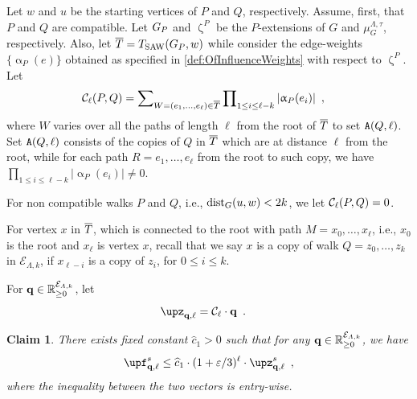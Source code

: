 \documentclass[11pt,reqno]{amsart}
\numberwithin{equation}{section}
\newtheorem{claim}[theorem]{Claim}
\newcommand{\cE}{{\mathcal{E}}}
\newcommand{\applegreen}[1]{ {\color{applegreen}#1}}
\newcommand{\amethyst}[1]{{\color{amethyst}#1} }
\newcommand{\blue}[1]{{\color{blue}#1}}
\newcommand{\bluepigment}[1]{{\color{blue(pigment)}#1}}
\newcommand{\bostonuniversityred}[1]{{\color{bostonuniversityred}#1}}
\newcommand{\capri}[1]{{\color{capri}#1}}
\newcommand{\cadmiumgreen}[1]{{\color{cadmiumgreen}#1}}
\newcommand{\darkmagenta}[1]{{\color{darkmagenta}#1}}
\newcommand{\goldenbrown}[1]{{\color{goldenbrown}#1}}
\newcommand{\heliotrope}[1]{{\color{heliotrope}#1}}
\newcommand{\iris}[1]{{\color{iris}#1}}
\newcommand{\red}[1]{{\color{red}#1}}
\newcommand{\dist}{{\rm dist}}
\newcommand{\ExtV}{\iris{\cE}}
\newcommand{\pfs}{\darkmagenta{s}}
\newcommand{\Tsaw}{T_{\rm SAW}}
\newcommand{\cp}{{\tt A}}
\newcommand{\abs}[1]{\blue{|}#1\blue{|}}
\renewcommand{\applegreen}[1]{#1}
\renewcommand{\amethyst}[1]{#1}
\renewcommand{\blue}[1]{#1}
\renewcommand{\bluepigment}[1]{#1}
\renewcommand{\bostonuniversityred}[1]{#1}
\renewcommand{\capri}[1]{#1}
\renewcommand{\cadmiumgreen}[1]{#1}
\renewcommand{\darkmagenta}[1]{#1}
\renewcommand{\goldenbrown}[1]{#1}
\renewcommand{\heliotrope}[1]{#1}
\renewcommand{\iris}[1]{#1}
\renewcommand{\red}[1]{#1}
\newcommand{\ke}{\blue{e}}
\newcommand{\ki}{\capri{i}}
\newcommand{\kk}{\bluepigment{k}}
\newcommand{\kell}{{\color{green(pigment)}\ell}}%
\newcommand{\kP}{\goldenbrown{P}}
\newcommand{\kQ}{\amethyst{Q}}
\newcommand{\kR}{\bostonuniversityred{R}}%
\newcommand{\ku}{\red{u}}
\newcommand{\kW}{\blue{W}}
\newcommand{\kw}{\blue{w}}
\newcommand{\kx}{\heliotrope{x}}
\newcommand{\kz}{\cadmiumgreen{z}}
\renewcommand{\ke}{e}
\renewcommand{\ki}{i}
\renewcommand{\kk}{k}
\renewcommand{\kell}{\ell}
\renewcommand{\kP}{P}
\renewcommand{\kQ}{Q}
\renewcommand{\kR}{R}
\renewcommand{\ku}{u}
\renewcommand{\kW}{W}
\renewcommand{\kw}{w}
\renewcommand{\kx}{x}
\renewcommand{\kz}{z}
\newcommand{\infweight}{\upalpha}
\begin{document}
Let  $\kw$ and $\ku$ be the starting vertices of $\kP$ and $\kQ$, respectively. Assume, first,  that $\kP$ and $\kQ$ are compatible.
Let $\gext{G}{\kP}$ and $\upzeta^{\kP}$ be the $\kP$-extensions of $G$ and  $\mu^{\Lambda,\tau}_G$, respectively. 
%
Also,  let $\TPP=\Tsaw(\gext{G}{\kP}, \kw)$ while consider the edge-weights 
$\{\infweight_{\kP}(\ke)\}$ obtained as specified in \eqref{def:OfInfluenceWeights} with respect to $\upzeta^{\kP}$. 
%
Let 
\begin{align}\nonumber
\SimpleExtdInfMatrixL_{\kell}(\kP, \kQ) &=\sum\nolimits_{\kW=(\ke_1, \ldots, \ke_{\kell})\in\TPP} \prod\nolimits_{1\leq \ki \leq \kell-\kk} \abs{ \infweight_{\kP}(\ke_{\ki})} \enspace, 
\end{align}
where $\kW$ varies over all the paths of length $\kell$ from the root of $\overline{T}$ to set $\cp(\kQ,\kell)$. Set $\cp(\kQ,\kell)$ consists of the 
copies of $\kQ$ in $\overline{T}$  which are at distance $\kell$ from the root, while for each path $\kR=\ke_1,\ldots, \ke_{\kell}$ from the root to 
 such copy, we have $\prod\nolimits_{1\leq \ki \leq \kell-\kk} \abs{ \infweight_{\kP}(\ke_{\ki})}\neq 0$. 


For non compatible walks $\kP$ and $\kQ$, i.e., $\dist_{G}(\ku,\kw)<2\kk$,  we let $\SimpleExtdInfMatrixL_{\kell}(\kP, \kQ) =0$. 

For vertex $\kx$ in $\overline{T}$, which is connected to the root with path 
$M=\kx_0, \ldots, \kx_{\kell}$, i.e., $\kx_0$ is the root and $\kx_{\kell}$ is vertex $\kx$, 
recall that we say $\kx$ is a copy of walk $\kQ=\kz_0,\ldots, \kz_{\kk}$ in $\ExtV_{\Lambda,\kk}$,
if $\kx_{\kell-\ki}$ is a copy of $\kz_{\ki}$, for $0\leq \ki\leq \kk$.
%




For $\vtest \in \mathbb{R}^{\ExtV_{\Lambda,\kk}}_{\geq 0}$, let
\begin{align}\label{eq:DefOfZQELL}
\SimpleFvec_{\vtest,\kell} &= \SimpleExtdInfMatrixL_{\kell} \cdot \vtest \enspace. 
\end{align}

\begin{claim}\label{claim:CQLVsCKL}
There exists fixed constant $\widehat{c}_1>0$ such that 
for any $\vtest \in \mathbb{R}^{\ExtV_{\Lambda,\kk}}_{\geq 0}$, we have
\begin{align}\label{eq:CQLVsCKL}
\vecF^{\pfs}_{\vtest, \kell} \leq \widehat{c}_1\cdot (1+\varepsilon/3)^{\kell} \cdot \SimpleFvec^{\pfs}_{\vtest,\kell} \enspace,
\end{align}
where the inequality between the two vectors is entry-wise.
\end{claim}
\end{document}
